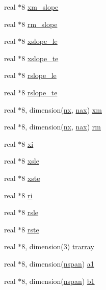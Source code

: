 \begin{DoxyCompactItemize}
real $\ast$8 \hyperlink{namespaceglobvar_acec26aa18c34a950efbf95fbe83fb5e3}{xm\+\_\+slope}
\item 
real $\ast$8 \hyperlink{namespaceglobvar_a7c5baea908b3455982aa5e0919c52887}{rm\+\_\+slope}
\item 
real $\ast$8 \hyperlink{namespaceglobvar_a6e2e677a1248884a0beaf14ef03a7d1e}{xslope\+\_\+le}
\item 
real $\ast$8 \hyperlink{namespaceglobvar_a1a3ff3ff118aab96696dca2da144a415}{xslope\+\_\+te}
\item 
real $\ast$8 \hyperlink{namespaceglobvar_a3f456fc3a0cf242d08ec86f9105644be}{rslope\+\_\+le}
\item 
real $\ast$8 \hyperlink{namespaceglobvar_a0669c0da9b37b2db9ee462980dc9df12}{rslope\+\_\+te}
\item 
real $\ast$8, dimension(\hyperlink{namespaceglobvar_ae4d2e4d1bd4180999afe29337165e1e6}{nx}, \hyperlink{namespaceglobvar_acff3033374e6d73d14fb06fc53fc205c}{nax}) \hyperlink{namespaceglobvar_aa5ba5cdfdecc13b0a215ac7e8bee5b9f}{xm}
\item 
real $\ast$8, dimension(\hyperlink{namespaceglobvar_ae4d2e4d1bd4180999afe29337165e1e6}{nx}, \hyperlink{namespaceglobvar_acff3033374e6d73d14fb06fc53fc205c}{nax}) \hyperlink{namespaceglobvar_abafcefbd5ca40029995e377b3763583a}{rm}
\item 
real $\ast$8 \hyperlink{namespaceglobvar_ab4afb7fee7167606b28de64b112f336c}{xi}
\item 
real $\ast$8 \hyperlink{namespaceglobvar_ab051d7b38899c922098ea01a71759a7b}{xsle}
\item 
real $\ast$8 \hyperlink{namespaceglobvar_a175236fc826dcd7229a2bc77e347288a}{xste}
\item 
real $\ast$8 \hyperlink{namespaceglobvar_a12aec4b3d6dfcab1523c9d90f90da9b9}{ri}
\item 
real $\ast$8 \hyperlink{namespaceglobvar_a672ec2d03f2dd0aabce80877d9183dd0}{rsle}
\item 
real $\ast$8 \hyperlink{namespaceglobvar_a7de91c05fa9558d6a5e2a2abf5a2b0eb}{rste}
\item 
real $\ast$8, dimension(3) \hyperlink{namespaceglobvar_a0256e20cf8e4b736584fce52a2be89ad}{trarray}
\item 
real $\ast$8, dimension(\hyperlink{namespaceglobvar_adeb7d084c25deee7802eab03d40830c5}{nspan}) \hyperlink{namespaceglobvar_a3597b44b373a600eb4d077e55967c69d}{a1}
\item 
real $\ast$8, dimension(\hyperlink{namespaceglobvar_adeb7d084c25deee7802eab03d40830c5}{nspan}) \hyperlink{namespaceglobvar_a957461f913a85866eb6d67bc8660bc5d}{b1}

\end{DoxyCompactItemize}
